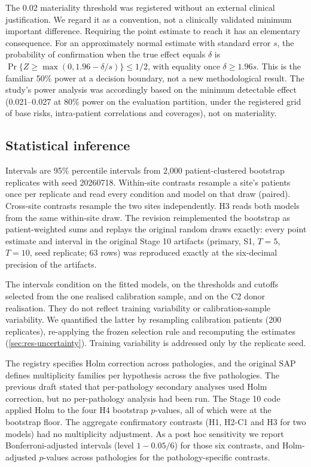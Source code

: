 The 0.02 materiality threshold was registered without an external clinical
justification. We regard it as a convention, not a clinically validated
minimum important difference. Requiring the point estimate to reach it has an
elementary consequence. For an approximately normal estimate with standard
error $s$, the probability of confirmation when the true effect equals $\delta$
is $\Pr\{Z\ge\max(0,1.96-\delta/s)\}\le 1/2$, with equality once $\delta\ge
1.96s$. This is the familiar 50\% power at a decision boundary, not a new
methodological result. The study's power analysis was accordingly
based on the minimum detectable effect (0.021--0.027 at 80\% power on the
evaluation partition, under the registered grid of base risks, intra-patient
correlations and coverages), not on materiality.

\subsection{Statistical inference}
Intervals are 95\% percentile intervals from 2,000 patient-clustered bootstrap
replicates with seed 20260718. Within-site contrasts resample a site's patients
once per replicate and read every condition and model on that draw (paired).
Cross-site contrasts resample the two sites independently. H3 reads both models
from the same within-site draw. The revision reimplemented the bootstrap as
patient-weighted sums and replays the original random draws exactly: every
point estimate and interval in the original Stage 10 artifacts (primary, S1,
$T=5$, $T=10$, seed replicate; 63 rows) was reproduced exactly at the six-decimal precision of the artifacts.

The intervals condition on the fitted models, on the thresholds and cutoffs
selected from the one realised calibration sample, and on the C2 donor
realisation. They do not reflect training variability or calibration-sample
variability. We quantified the latter by resampling calibration patients (200
replicates), re-applying the frozen selection rule and recomputing the
estimates (\cref{sec:res-uncertainty}). Training variability is addressed only
by the replicate seed.

The registry specifies Holm correction across pathologies, and the original
SAP defines multiplicity families per hypothesis across the five
pathologies. The previous draft stated that per-pathology secondary analyses
used Holm correction, but no per-pathology analysis had been run. The Stage 10
code applied Holm to the four H4 bootstrap $p$-values, all of which were at the
bootstrap floor. The aggregate confirmatory contrasts (H1, H2-C1 and H3 for two
models) had no multiplicity adjustment. As a post hoc sensitivity we report
Bonferroni-adjusted intervals (level $1-0.05/6$) for those six contrasts, and
Holm-adjusted $p$-values across pathologies for the pathology-specific
contrasts.

